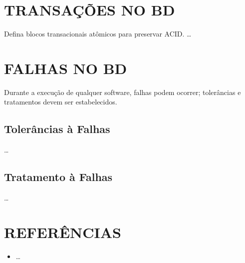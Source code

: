 \documentclass[
12pt,
a4paper,
semrecuonosumario,
sumario = abnt-6027-2012]{report}
\begin{document}
\chapter{TRANSAÇÕES NO BD}\label{chap:transacoes}
Defina blocos transacionais atômicos para preservar ACID.
\dots

\chapter{FALHAS NO BD}\label{chap:falhas}
Durante a execução de qualquer software, falhas podem ocorrer; tolerâncias e tratamentos devem ser estabelecidos.

    \section{Tolerâncias à Falhas}
    \dots

    \section{Tratamento à Falhas}
    \dots

\clearpage
\chapter*{REFERÊNCIAS}
\vspace{-0.5em}
\begin{itemize}
  \item \dots
\end{itemize}
\end{document}
